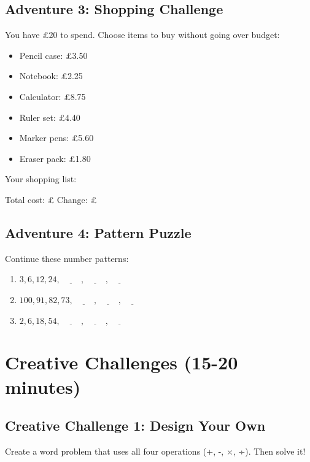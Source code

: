 \documentclass{article}
\begin{document}
\subsection*{Adventure 3: Shopping Challenge}
You have £20 to spend. Choose items to buy without going over budget:
\begin{itemize}
    \item Pencil case: £3.50
    \item Notebook: £2.25
    \item Calculator: £8.75
    \item Ruler set: £4.40
    \item Marker pens: £5.60
    \item Eraser pack: £1.80
\end{itemize}

Your shopping list: \underline{\hspace{8cm}}

Total cost: £\underline{\hspace{2cm}} \quad Change: £\underline{\hspace{2cm}}

\subsection*{Adventure 4: Pattern Puzzle}
Continue these number patterns:
\begin{enumerate}
    \item $3, 6, 12, 24, \underline{\hspace{1cm}}, \underline{\hspace{1cm}}, \underline{\hspace{1cm}}$
    \item $100, 91, 82, 73, \underline{\hspace{1cm}}, \underline{\hspace{1cm}}, \underline{\hspace{1cm}}$
    \item $2, 6, 18, 54, \underline{\hspace{1cm}}, \underline{\hspace{1cm}}, \underline{\hspace{1cm}}$
\end{enumerate}

\section{Creative Challenges (15-20 minutes)}

\subsection*{Creative Challenge 1: Design Your Own}
Create a word problem that uses all four operations (+, -, ×, ÷). Then solve it!
\end{document}
